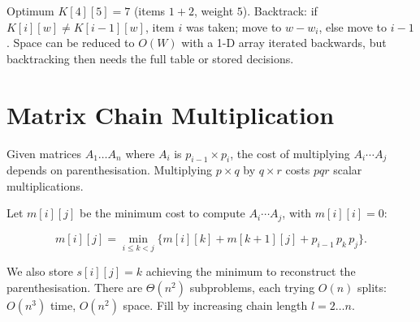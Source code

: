 \begin{center}\end{center}
Optimum $K[4][5]=7$ (items $1{+}2$, weight $5$). Backtrack: if $K[i][w]\neq K[i-1][w]$, item $i$ was taken; move to $w-w_i$, else move to $i-1$. Space can be reduced to $O(W)$ with a 1-D array iterated backwards, but backtracking then needs the full table or stored decisions.

\section{Matrix Chain Multiplication}
\label{sec:matrix-chain}

Given matrices $A_1\ldots A_n$ where $A_i$ is $p_{i-1}\times p_i$, the cost of multiplying $A_i\cdots A_j$ depends on parenthesisation. Multiplying $p\times q$ by $q\times r$ costs $pqr$ scalar multiplications.

\begin{center}\end{center}
Let $m[i][j]$ be the minimum cost to compute $A_i\cdots A_j$, with $m[i][i]=0$:

\[
m[i][j] = \min_{i\le k < j} \bigl\{m[i][k] + m[k+1][j] + p_{i-1}\,p_k\,p_j\bigr\}.
\]

We also store $s[i][j]=k$ achieving the minimum to reconstruct the parenthesisation. There are $\Theta(n^2)$ subproblems, each trying $O(n)$ splits: $O(n^3)$ time, $O(n^2)$ space. Fill by increasing chain length $l=2\ldots n$.


